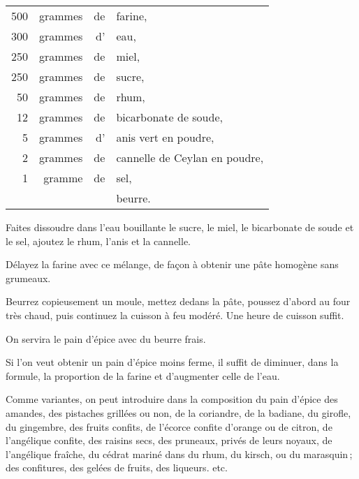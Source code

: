 \footnotesize
\begin{longtable}{rrrp{16em}}
    500 & grammes & de & farine,                                                                          \\
    300 & grammes & d' & eau,                                                                             \\
    250 & grammes & de & miel,                                                                            \\
    250 & grammes & de & sucre,                                                                           \\
     50 & grammes & de & rhum,                                                                            \\
     12 & grammes & de & bicarbonate de soude,                                                            \\
      5 & grammes & d' & anis vert en poudre,                                                             \\
      2 & grammes & de & cannelle de Ceylan en poudre,                                                    \\
      1 & gramme  & de & sel,                                                                             \\
        &         &    & beurre.                                                                          \\
\end{longtable}
\normalsize

Faites dissoudre dans l'eau bouillante le sucre, le miel, le bicarbonate de
soude et le sel, ajoutez le rhum, l'anis et la cannelle.

Délayez la farine avec ce mélange, de façon à obtenir une pâte homogène sans
grumeaux.

Beurrez copieusement un moule, mettez dedans la pâte, poussez d'abord au four
très chaud, puis continuez la cuisson à feu modéré. Une heure de cuisson suffit.

On servira le pain d'épice avec du beurre frais.

\sk

Si l'on veut obtenir un pain d'épice moins ferme, il suffit de diminuer, dans
la formule, la proportion de la farine et d'augmenter celle de l’eau.

\sk

Comme variantes, on peut introduire dans la composition du pain d'épice des
amandes, des pistaches grillées ou non, de la coriandre, de la badiane, du
girofle, du gingembre, des fruits confits, de l'écorce confite d'orange ou de
citron, de l’angélique confite, des raisins secs, des pruneaux, privés de leurs
noyaux, de l'angélique fraîche, du cédrat mariné dans du rhum, du kirsch, ou du
marasquin ; des confitures, des gelées de fruits, des liqueurs. etc.

\sk
